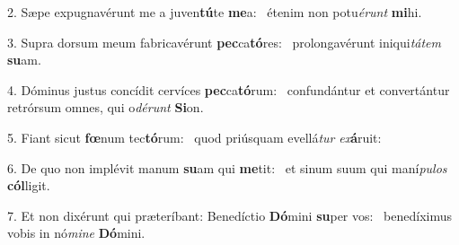 2. Sæpe expugnavérunt me a juven\textbf{tú}te \textbf{me}a: \ast\  étenim non potu\textit{é}\textit{runt} \textbf{mi}hi.\

3. Supra dorsum meum fabricavérunt \textbf{pec}ca\textbf{tó}res: \ast\  prolongavérunt iniqui\textit{tá}\textit{tem} \textbf{su}am.\

4. Dóminus justus concídit cervíces \textbf{pec}ca\textbf{tó}rum: \ast\  confundántur et convertántur retrórsum omnes, qui o\textit{dé}\textit{runt} \textbf{Si}on.\

5. Fiant sicut \textbf{fœ}num tec\textbf{tó}rum: \ast\  quod priúsquam evellá\textit{tur} \textit{ex}\textbf{á}ruit:\

6. De quo non implévit manum \textbf{su}am qui \textbf{me}tit: \ast\  et sinum suum qui maní\textit{pu}\textit{los} \textbf{cól}ligit.\

7. Et non dixérunt qui præteríbant: Benedíctio \textbf{Dó}mini \textbf{su}per vos: \ast\  benedíximus vobis in nó\textit{mi}\textit{ne} \textbf{Dó}mini.\

